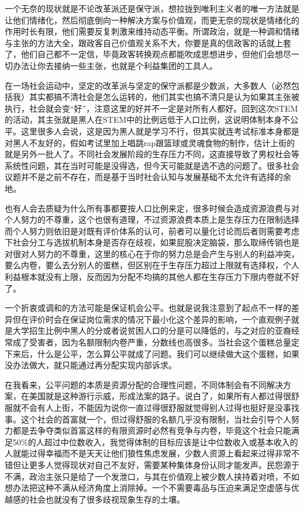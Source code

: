 \documentclass[]{book}
\begin{document}
一个无奈的现状就是不论改革派还是保守派，想拉拢到唯利主义者的唯一方法就是让他们情绪化，然后彻底倒向一种解决方案与价值观，而更无奈的现状是情绪化的作用时长有限，他们需要反复刺激来维持动态平衡。所谓政治，就是一种调和情绪与主张的方法大全，跟政客自己价值观关系不大，你要是真的信政客的话就上套了，他们自己都不一定信，毕竟政客转换观点都能吹成思想进步，但他们会想尽一切办法让你去接纳一些主张，也就是个利益集团的工具人。

在一场社会运动中，坚定的改革派与坚定的保守派都是少数派，大多数人（必然包括我）其实都搞不清社会是怎么运转的，他们其实也搞不清只是认为如果其主张被执行，社会就会变``好''，注意这里的好并不一定是对所有人都好。回到这次STEM的活动，其主张就是黑人在STEM中的比例远低于人口比例，这说明体制本身不公平。这里很多人会说，这是因为黑人就是学习不行，但其实就连考试标准本身都是对黑人不友好的，假如考试里加上唱跳rap跟篮球或灵魂食物的制作，估计上街的就是另外一批人了。不同社会发展阶段的生存压力不同，这直接导致了男权社会等系统性问题，其在当时可能是没得选，但今天可能就是选不选的问题了。很多社会议题并不是之前不存在，而是基于当时社会认知与发展基础不太允许有选择的余地。

也有人会去质疑为什么所有事都要按人口比例来定，很多时候会造成资源浪费与对个人努力的不尊重，这个也很有道理，不过资源浪费本质上是生存压力在限制选择而个人努力则依旧是对既有评价体系的认可，前者可以量化讨论而后者则需要考虑下社会分工与选拔机制本身是否存在歧视，如果屁股决定脑袋，那么取缔传销也是对很对人努力的不尊重，这里的核心在于你的努力总是会产生与别人的利益冲突，要么内卷，要么去分别人的蛋糕，但区别在于生存压力超过上限就有选择权，个人利益根本就没有上限，反而因为分配不均搞的其他人都在生存压力下限内卷就不好了。

一个折衷或调和的方法可能是保证机会公平。也就是说我注意到了起点不一样的差异但在评价时会在保证岗位需求的情况下最小化这个差异的影响，一个直观例子就是大学招生比例中黑人的分或者说贫困人口的分是可以降低的，与之对应的亚裔经常成了受害者，因为名额限制内卷严重，分数线也高很多。当社会这个蛋糕总量定下来后，什么是公平，怎么算公平就成了问题。我们可以继续做大这个蛋糕，如果没办法做大，就只能通过再分配实现内部诉求。

在我看来，公平问题的本质是资源分配的合理性问题，不同体制会有不同解决方案，在美国就是这种游行示威，形成法案的路子。说白了，如果所有人都过得很舒服就不会有人上街，不能因为说你一直过得很舒服就觉得别人过得也挺好是没事找事。这个社会的首富就一个，但过得舒服的名额几乎没有限制，当社会引导个人努力都是去争夺类似首富这样的有限资源时必然有竞争与内卷，毕竟这个社会只能满足50\%的人超过中位数收入，我觉得体制的目标应该是让中位数收入或基本收入的人就能过得幸福而不是天天让他们狼性焦虑发展，少数人资源上看起来过得非常不错但让更多人觉得现状对自己不友好，需要某种集体身份认同才能发声。民怨源于不满，政治主张只是给了一个发泄口，与其在价值观上被少数人挟持着对喷，不如想办法把这种不满从经济角度上消除掉。一个不需要毒品与压迫来满足空虚感与优越感的社会也就没有了很多歧视现象生存的土壤。
\end{document}
